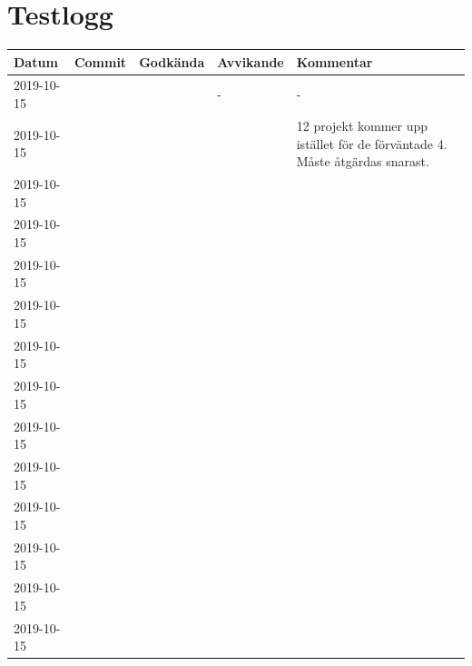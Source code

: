 \documentclass{TDP003mall}
\begin{document}
\section{Testlogg}

\begin{tabular}{|l|l|l|l|l|}
  \hline
  Datum & Commit & Godkända & Avvikande & Kommentar \\ [0.5ex]
  \hline
  2019-10-15 &  &  & - & - \\
  \hline
  \hline
  2019-10-15 &  &  &  & 12 projekt kommer upp istället för de förväntade 4. Måste åtgärdas snarast.\\
  \hline
  \hline
  2019-10-15 &  &  &  & \\
  \hline
  \hline
  2019-10-15 &  &  &  & \\
  \hline
  \hline
  2019-10-15 &  &  &  & \\
  \hline
  \hline
  2019-10-15 &  &  &  & \\
  \hline
  \hline
  2019-10-15 &  &  &  & \\
  \hline
  \hline
  2019-10-15 &  &  &  & \\
  \hline
  \hline
  2019-10-15 &  &  &  & \\
  \hline
  \hline
  2019-10-15 &  &  &  & \\
  \hline
  \hline
  2019-10-15 &  &  &  & \\
  \hline
  \hline
  2019-10-15 &  &  &  & \\
  \hline
  \hline
  2019-10-15 &  &  &  & \\
  \hline
  \hline
  2019-10-15 &  &  &  & \\
  \hline
\end{tabular}





\end{document}
